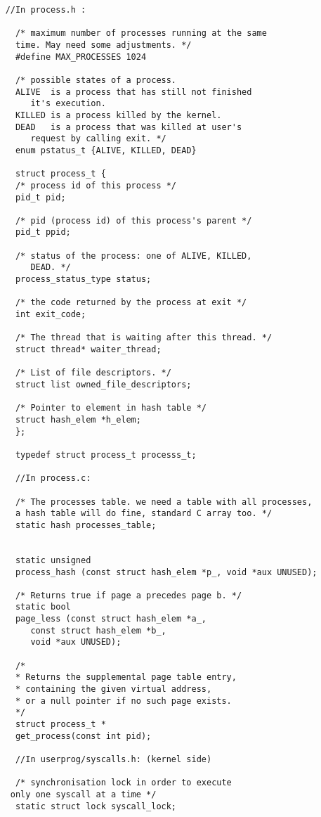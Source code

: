     \begin{lstlisting}
    //In process.h :

      /* maximum number of processes running at the same 
      time. May need some adjustments. */
      #define MAX_PROCESSES 1024

      /* possible states of a process. 
	  ALIVE  is a process that has still not finished 
		 it's execution. 
	  KILLED is a process killed by the kernel.
	  DEAD 	 is a process that was killed at user's 
		 request by calling exit. */
      enum pstatus_t {ALIVE, KILLED, DEAD}

      struct process_t {
	  /* process id of this process */
	  pid_t pid;				

	  /* pid (process id) of this process's parent */
	  pid_t ppid;				
	  
	  /* status of the process: one of ALIVE, KILLED, 
	     DEAD. */
	  process_status_type status;
      
	  /* the code returned by the process at exit */
	  int exit_code;

	  /* The thread that is waiting after this thread. */
	  struct thread* waiter_thread;

	  /* List of file descriptors. */
	  struct list owned_file_descriptors;

	  /* Pointer to element in hash table */
	  struct hash_elem *h_elem;
      };
    
      typedef struct process_t processs_t;

      //In process.c: 

      /* The processes table. we need a table with all processes, 
      a hash table will do fine, standard C array too. */
      static hash processes_table;

     
      static unsigned
      process_hash (const struct hash_elem *p_, void *aux UNUSED);
      
      /* Returns true if page a precedes page b. */
      static bool
      page_less (const struct hash_elem *a_, 
		 const struct hash_elem *b_,
		 void *aux UNUSED);	

      /*
      * Returns the supplemental page table entry, 
      * containing the given virtual address,
      * or a null pointer if no such page exists.
      */
      struct process_t *
      get_process(const int pid);

      //In userprog/syscalls.h: (kernel side)
      
      /* synchronisation lock in order to execute
	 only one syscall at a time */
      static struct lock syscall_lock;


\end{lstlisting}
